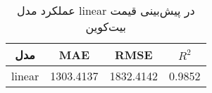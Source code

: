 
        \begin{table}[h]
            \centering
            \begin{tabular}{cccc}
                \toprule
                \textbf{مدل} & \textbf{MAE} & \textbf{RMSE} & \textbf{ \(R^2\) } \\
                \midrule
                linear & 1303.4137 & 1832.4142 & 0.9852 \\
                \bottomrule
            \end{tabular}
            \caption{عملکرد مدل linear در پیش‌بینی قیمت بیت‌کوین}
            \label{tab:linear_performance}
        \end{table}
        